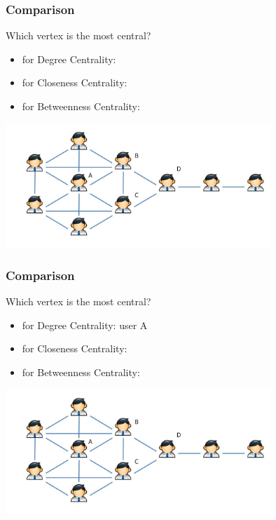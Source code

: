 \begin{frame}
  \frametitle{Comparison}
  \begin{block}{Which vertex is the most central?}
    \begin{itemize}
      \item for Degree Centrality:
      \item for Closeness Centrality:
      \item for Betweenness Centrality:
    \end{itemize}
  \end{block}
  \centering
  \includegraphics[width=100mm]{imgs/centrality_comparison.pdf}
\end{frame}

\begin{frame}
  \frametitle{Comparison}
  \begin{block}{Which vertex is the most central?}
    \begin{itemize}
      \item for Degree Centrality:  {\color{blue}  user A}
      \item for Closeness Centrality:
      \item for Betweenness Centrality:
    \end{itemize}
  \end{block}
  \centering
  \includegraphics[width=100mm]{imgs/centrality_comparison.pdf}
\end{frame}

